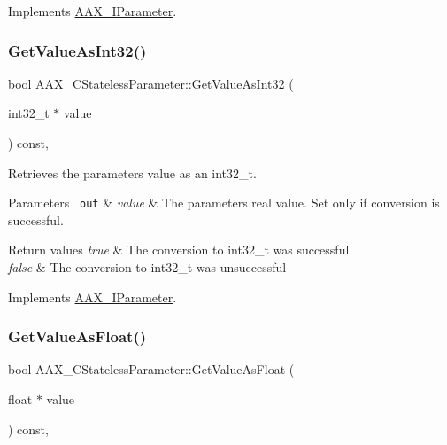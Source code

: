 Implements \mbox{\hyperlink{a01857_a9d86d7e89489e7f7ccbacaa55eb98f72}{A\+A\+X\+\_\+\+I\+Parameter}}.

\mbox{\label{a01541_a198b595497ef9e04a56b212a94b6150a}} 
\subsubsection{\texorpdfstring{GetValueAsInt32()}{GetValueAsInt32()}}
{\footnotesize\ttfamily bool A\+A\+X\+\_\+\+C\+Stateless\+Parameter\+::\+Get\+Value\+As\+Int32 (\begin{DoxyParamCaption}\item[{int32\+\_\+t $\ast$}]{value }\end{DoxyParamCaption}) const\hspace{0.3cm}{\ttfamily [inline]}, {\ttfamily [virtual]}}



Retrieves the parameter\textquotesingle{}s value as an int32\+\_\+t. 


\begin{DoxyParams}[1]{Parameters}
\mbox{\texttt{ out}}  & {\em value} & The parameter\textquotesingle{}s real value. Set only if conversion is successful.\\
\hline
\end{DoxyParams}

\begin{DoxyRetVals}{Return values}
{\em true} & The conversion to int32\+\_\+t was successful \\
\hline
{\em false} & The conversion to int32\+\_\+t was unsuccessful \\
\hline
\end{DoxyRetVals}


Implements \mbox{\hyperlink{a01857_a2a7d538cbb30de98c5d55acdddbec05f}{A\+A\+X\+\_\+\+I\+Parameter}}.

\mbox{\label{a01541_a8d925887f2c4ea3b6d06e077c06fc01f}} 
\subsubsection{\texorpdfstring{GetValueAsFloat()}{GetValueAsFloat()}}
{\footnotesize\ttfamily bool A\+A\+X\+\_\+\+C\+Stateless\+Parameter\+::\+Get\+Value\+As\+Float (\begin{DoxyParamCaption}\item[{float $\ast$}]{value }\end{DoxyParamCaption}) const\hspace{0.3cm}{\ttfamily [inline]}, {\ttfamily [virtual]}}



